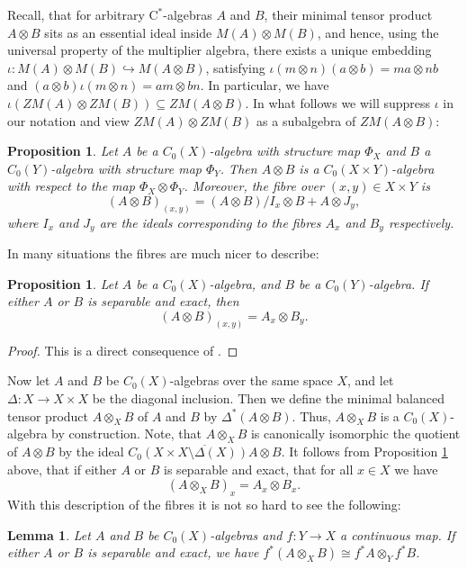 \documentclass[reqno,oneside,a4paper,11pt]{amsart}
\theoremstyle{theorem}
\newtheorem{lemma}[satz]{Lemma}
\newtheorem{prop}[satz]{Proposition}
\theoremstyle{definition}
\begin{document}
	Recall, that for arbitrary $\mathrm{C}^*$-algebras $A$ and $B$, their minimal tensor product $A\otimes B$ sits as an essential ideal inside $M(A)\otimes M(B)$, and hence, using the universal property of the multiplier algebra, there exists a unique embedding $\iota: M(A)\otimes M(B)\hookrightarrow M(A\otimes B)$, satisfying $\iota(m\otimes n)(a\otimes b)=ma\otimes nb$ and $(a\otimes b)\iota(m\otimes n)=am\otimes bn$. In particular, we have $\iota(ZM(A)\otimes ZM(B))\subseteq ZM(A\otimes B)$. In what follows we will suppress $\iota$ in our notation and view $ZM(A)\otimes ZM(B)$ as a subalgebra of $ZM(A\otimes B)$:
	\begin{prop}\cite[Proposition~3.4]{MR3549520}
		Let $A$ be a $C_0(X)$-algebra with structure map $\Phi_X$ and $B$ a $C_0(Y)$-algebra with structure map $\Phi_Y$. Then $A\otimes B$ is a $C_0(X\times Y)$-algebra with respect to the map $\Phi_X\otimes \Phi_Y$. Moreover, the fibre over $(x,y)\in X\times Y$ is $$(A\otimes B)_{(x,y)}=(A\otimes B)/I_x\otimes B+A\otimes J_y,$$ where $I_x$ and $J_y$ are the ideals corresponding to the fibres $A_x$ and $B_y$ respectively.
	\end{prop}
	In many situations the fibres are much nicer to describe:
	\begin{prop}\label{Prop:FibresMinimalTensorProduct}
		Let $A$ be a $C_0(X)$-algebra, and $B$ be a $C_0(Y)$-algebra. If either $A$ or $B$ is separable and exact, then $$(A\otimes B)_{(x,y)}=A_x\otimes B_y.$$
	\end{prop}
	\begin{proof}
		This is a direct consequence of \cite[IV.3.4.22, Proposition~IV.3.4.23]{MR2188261}.
	\end{proof}
	Now let $A$ and $B$ be $C_0(X)$-algebras over the same space $X$, and let $\Delta:X\rightarrow X\times X$ be the diagonal inclusion. Then we define the minimal balanced tensor product $A\otimes_X B$ of $A$ and $B$ by $\Delta^*(A\otimes B)$. Thus, $A\otimes_X B$ is a $C_0(X)$-algebra by construction. Note, that $A\otimes_X B$ is canonically isomorphic the quotient of $A\otimes B$ by the ideal $\overline{C_0(X\times X\setminus \Delta(X))A\otimes B}$.
	It follows from Proposition \ref{Prop:FibresMinimalTensorProduct} above, that if either $A$ or $B$ is separable and exact, that for all $x\in X$ we have
	$$(A\otimes_X B)_x=A_x\otimes B_x.$$
	With this description of the fibres it is not so hard to see the following:
	\begin{lemma}
		Let $A$ and $B$ be $C_0(X)$-algebras and $f:Y\rightarrow X$ a continuous map. If either $A$ or $B$ is separable and exact, we have $f^*(A\otimes_X B)\cong f^*A\otimes_Y f^*B$.
	\end{lemma}
\end{document}
